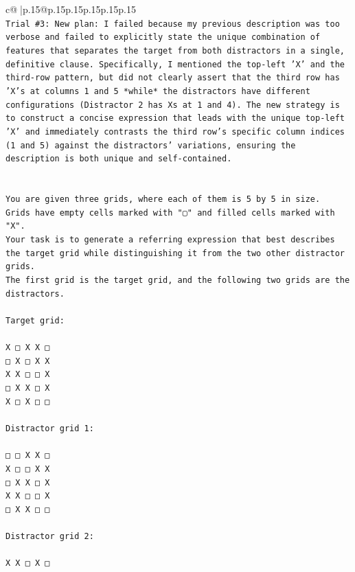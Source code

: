 \documentclass{article}
\begin{document}
{\begin{supertabular}{c@{$\;$}|p{.15\linewidth}@{}p{.15\linewidth}p{.15\linewidth}p{.15\linewidth}p{.15\linewidth}p{.15\linewidth}}
{{{\\ 
\texttt{Trial \#3: New plan: I failed because my previous description was too verbose and failed to explicitly state the unique combination of features that separates the target from both distractors in a single, definitive clause. Specifically, I mentioned the top{-}left 'X' and the third{-}row pattern, but did not clearly assert that the third row has 'X's at columns 1 and 5 *while* the distractors have different configurations (Distractor 2 has Xs at 1 and 4). The new strategy is to construct a concise expression that leads with the unique top{-}left 'X' and immediately contrasts the third row's specific column indices (1 and 5) against the distractors' variations, ensuring the description is both unique and self{-}contained.} \\
\\ 
\\ 
\texttt{You are given three grids, where each of them is 5 by 5 in size.} \\
\texttt{Grids have empty cells marked with "▢" and filled cells marked with "X".} \\
\texttt{Your task is to generate a referring expression that best describes the target grid while distinguishing it from the two other distractor grids.} \\
\texttt{The first grid is the target grid, and the following two grids are the distractors.} \\
\\ 
\texttt{Target grid:} \\
\\ 
\texttt{X □ X X □} \\
\texttt{□ X □ X X} \\
\texttt{X X □ □ X} \\
\texttt{□ X X □ X} \\
\texttt{X □ X □ □} \\
\\ 
\texttt{Distractor grid 1:} \\
\\ 
\texttt{□ □ X X □} \\
\texttt{X □ □ X X} \\
\texttt{□ X X □ X} \\
\texttt{X X □ □ X} \\
\texttt{□ X X □ □} \\
\\ 
\texttt{Distractor grid 2:} \\
\\ 
\texttt{X X □ X □} \\
}}}
\end{supertabular}}
\end{document}

